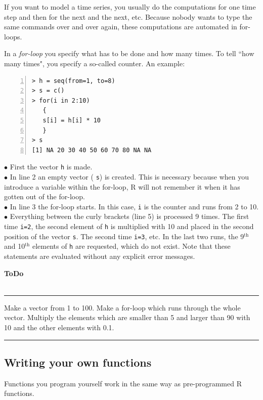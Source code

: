 \documentclass[a4paper,11pt,twocolumn,tablecaptionabove]{scrartcl}
\newenvironment{ToDo} {%
  \begin{flushright}
    \hfill
    \begin{minipage}{0.95\columnwidth}         %
    \textsf{\textbf{ToDo}} \\
      \vspace{-0.85cm}\\
      {\color{Gray}\rule[-0.1cm]{\columnwidth}{1.5pt}}} { %
      {\color{Gray} \rule[0.3cm]{\columnwidth}{1.5pt}}
    \end{minipage}
    \vspace{1em}
  \end{flushright}
  }
\begin{document}
If you want to model a time series, you usually do the computations for one time step and then for the next and the next, etc. Because nobody wants to type the same commands over and over again, these computations are automated in for-loops. 

In a \emph{for-loop} you specify what has to be done and how many times. To tell ``how many times", you specify a so-called counter. An example:

\begin{Verbatim}[frame=single,numbers=left,gobble=0, xleftmargin=0.35cm, numbersep=0.1cm]
> h = seq(from=1, to=8)
> s = c()
> for(i in 2:10) 
   {
   s[i] = h[i] * 10
   }
> s
[1] NA 20 30 40 50 60 70 80 NA NA
\end{Verbatim}

\noindent $\bullet$ First the vector  \texttt{h} is made.\\
\noindent $\bullet$ In line 2 an empty vector ( \texttt{s}) is created. This is necessary because when you introduce a variable within the for-loop, R will not remember it when it has gotten out of the for-loop.\\
\noindent $\bullet$  In line 3 the for-loop starts. In this case, \texttt{i} is the counter and runs from 2 to 10.\\
\noindent $\bullet$ Everything between the curly brackets (line 5) is processed 9 times. The first time \texttt{i=2}, the second element of \texttt{h} is multiplied with 10 and placed in the second position of the vector \texttt{s}. The second time \texttt{i=3}, etc. In the last two runs, the 9$^\mathrm{th}$ and 10$^\mathrm{th}$ elements of \texttt{h} are requested, which do not exist. Note that these statements are evaluated without any explicit error messages.

\begin{ToDo}
Make a vector from 1 to 100. Make a for-loop which runs through the whole vector. Multiply the elements which are smaller than 5 and larger than 90 with 10 and the other elements with 0.1.
\end{ToDo}

\subsection{Writing your own functions}
\label{sec:progfunc}

Functions you program yourself work in the same way as pre-programmed R functions.
\end{document}
